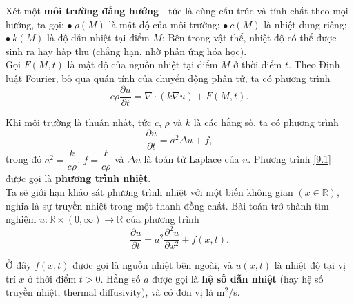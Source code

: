 \documentclass[10pt, a4paper]{article}
\begin{document}
	Xét một \textbf{môi trường đẳng hướng} - tức là cùng cấu trúc và tính chất theo mọi hướng, ta gọi:\vskip10pt
	\quad$\bullet~\rho(M)$ là mật độ của môi trường;\vskip7pt
	\quad$\bullet~c(M)$ là nhiệt dung riêng;\vskip7pt
	\quad$\bullet~k(M)$ là độ dẫn nhiệt tại điểm $M$: Bên trong vật thể, nhiệt độ có thể được sinh ra hay hấp thu (chẳng hạn, nhờ phản ứng hóa học).\\
	
	Gọi $F(M,t)$ là mật độ của nguồn nhiệt tại điểm $M$ ở thời điểm $t$. Theo Định luật Fourier, bỏ qua quán tính của chuyển động phân tử, ta có phương trình $$c\rho\frac{\partial u}{\partial t}=\nabla\cdot(k\nabla u)+F(M,t).$$
	
	Khi môi trường là thuần nhất, tức $c$, $\rho$ và $k$ là các hằng số, ta có phương trình \begin{equation} \tag{9.1} \label{9.1}
		\frac{\partial u}{\partial t}=a^2\Delta u+f,
	\end{equation}
	trong đó $a^2=\dfrac{k}{c\rho},\,f=\dfrac{F}{c\rho}$ và $\Delta u$ là toán tử Laplace của $u$. Phương trình \ref{9.1} được gọi là \textbf{\color{red}phương trình nhiệt}.\\
	
	Ta sẽ giới hạn khảo sát phương trình nhiệt với một biến không gian $(x\in\mathbb R)$, nghĩa là sự truyền nhiệt trong một thanh đồng chất. Bài toán trở thành tìm nghiệm $u:\mathbb R\times(0,\infty)\to\mathbb R$ của phương
	trình \begin{equation} \tag{9.2} \label{9.2}
		\frac{\partial u}{\partial t}=a^2\frac{\partial^2u}{\partial x^2}+f(x,t).
	\end{equation}
	
	Ở đây $f(x,t)$ được gọi là nguồn nhiệt bên ngoài, và $u(x,t)$ là nhiệt độ tại vị trí $x$ ở thời điểm $t>0$. Hằng số $a$ được gọi là \textbf{hệ số dẫn nhiệt} (hay hệ số truyền nhiệt, thermal
	diffusivity), và có đơn vị là m$^2$/s.
\end{document}
